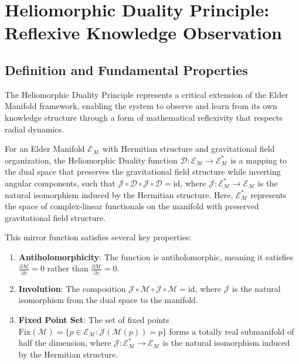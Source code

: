 \section{Heliomorphic Duality Principle: Reflexive Knowledge Observation}

\subsection{Definition and Fundamental Properties}

The Heliomorphic Duality Principle represents a critical extension of the Elder Manifold framework, enabling the system to observe and learn from its own knowledge structure through a form of mathematical reflexivity that respects radial dynamics.

\begin{definition}
For an Elder Manifold $\mathcal{E}_{\mathcal{M}}$ with Hermitian structure and gravitational field organization, the Heliomorphic Duality function $\mathcal{D}: \mathcal{E}_{\mathcal{M}} \rightarrow \mathcal{E}_{\mathcal{M}}^*$ is a mapping to the dual space that preserves the gravitational field structure while inverting angular components, such that $\mathcal{J} \circ \mathcal{D} \circ \mathcal{J} \circ \mathcal{D} = \text{id}$, where $\mathcal{J}: \mathcal{E}_{\mathcal{M}}^* \rightarrow \mathcal{E}_{\mathcal{M}}$ is the natural isomorphism induced by the Hermitian structure. Here, $\mathcal{E}_{\mathcal{M}}^*$ represents the space of complex-linear functionals on the manifold with preserved gravitational field structure.
\end{definition}

This mirror function satisfies several key properties:

\begin{enumerate}
\item \textbf{Antiholomorphicity}: The function is antiholomorphic, meaning it satisfies $\frac{\partial \mathcal{M}}{\partial \overline{z}} = 0$ rather than $\frac{\partial \mathcal{M}}{\partial z} = 0$.
\item \textbf{Involution}: The composition $\mathcal{J} \circ \mathcal{M} \circ \mathcal{J} \circ \mathcal{M} = \text{id}$, where $\mathcal{J}$ is the natural isomorphism from the dual space to the manifold.
\item \textbf{Fixed Point Set}: The set of fixed points $\text{Fix}(\mathcal{M}) = \{p \in \mathcal{E}_{\mathcal{M}} : \mathcal{J}(\mathcal{M}(p)) = p\}$ forms a totally real submanifold of half the dimension, where $\mathcal{J}: \mathcal{E}_{\mathcal{M}}^* \rightarrow \mathcal{E}_{\mathcal{M}}$ is the natural isomorphism induced by the Hermitian structure.
\end{enumerate}

